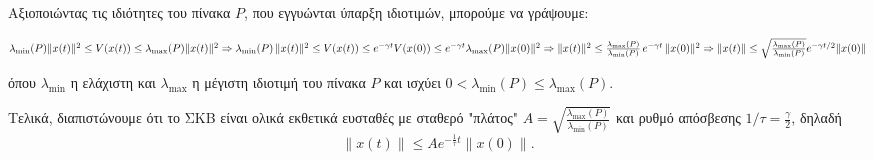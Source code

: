 \documentclass{article}
\begin{document}
\hfill\break
Αξιοποιώντας τις ιδιότητες του πίνακα \(P\), που εγγυώνται ύπαρξη ιδιοτιμών, μπορούμε να γράψουμε:

\hfill\break
\begin{math}
    \lambda_{\min}(P)\|x(t)\|^2 \le V(x(t)) \le \lambda_{\max}(P)\|x(t)\|^2 \Rightarrow \\[10pt]
    \lambda_{\min}(P)\,\|x(t)\|^2 \le V(x(t)) \le e^{-\gamma t}V(x(0)) \le e^{-\gamma t}\lambda_{\max}(P)\|x(0)\|^2 \Rightarrow \\[10pt]
    \|x(t)\|^2 \le \frac{\lambda_{\max}(P)}{\lambda_{\min}(P)}\,e^{-\gamma t}\,\|x(0)\|^2 \Rightarrow \\[10pt]
    \|x(t)\| \le \sqrt{\frac{\lambda_{\max}(P)}{\lambda_{\min}(P)}} e^{-\gamma t/2} \|x(0)\|
\end{math}

\hfill\break
όπου \(\lambda_{\min}\) η ελάχιστη και \(\lambda_{\max}\) η μέγιστη ιδιοτιμή του πίνακα \(P\) και ισχύει \(0 < \lambda_{\min}(P) \le \lambda_{\max}(P)\).

\hfill\break
Τελικά, διαπιστώνουμε ότι το ΣΚΒ είναι ολικά εκθετικά ευσταθές με σταθερό "πλάτος" \(A=\sqrt{\frac{\lambda_{\max}(P)}{\lambda_{\min}(P)}}\) και ρυθμό απόσβεσης \(1/\tau = \frac{\gamma}{2}\), δηλαδή
\[
\|x(t)\| \le Α e^{-\frac{1}{\tau} t}\|x(0)\|.
\]
\end{document}
